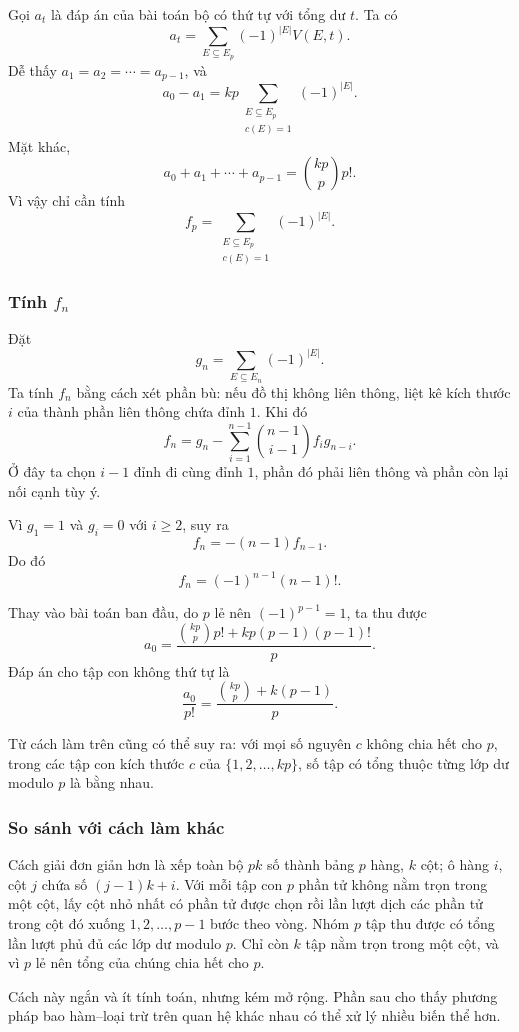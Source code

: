 \documentclass[11pt]{article}
\begin{document}
Gọi $a_t$ là đáp án của bài toán bộ có thứ tự với tổng dư $t$. Ta có
\[
  a_t=\sum_{E\subseteq E_p}(-1)^{|E|}V(E,t).
\]
Dễ thấy $a_1=a_2=\cdots=a_{p-1}$, và
\[
  a_0-a_1=kp\sum_{\substack{E\subseteq E_p\\ c(E)=1}}(-1)^{|E|}.
\]
Mặt khác,
\[
  a_0+a_1+\cdots+a_{p-1}=\binom{k p}{p}p!.
\]
Vì vậy chỉ cần tính
\[
  f_p=\sum_{\substack{E\subseteq E_p\\ c(E)=1}}(-1)^{|E|}.
\]

\subsubsection{\texorpdfstring{Tính \(f_n\)}{Tính fn}}

Đặt
\[
  g_n=\sum_{E\subseteq E_n}(-1)^{|E|}.
\]
Ta tính $f_n$ bằng cách xét phần bù: nếu đồ thị không liên thông, liệt kê kích
thước $i$ của thành phần liên thông chứa đỉnh $1$. Khi đó
\[
  f_n
  =g_n-\sum_{i=1}^{n-1}\binom{n-1}{i-1}f_i g_{n-i}.
\]
Ở đây ta chọn $i-1$ đỉnh đi cùng đỉnh $1$, phần đó phải liên thông và phần còn
lại nối cạnh tùy ý.

Vì $g_1=1$ và $g_i=0$ với $i\ge 2$, suy ra
\[
  f_n=-(n-1)f_{n-1}.
\]
Do đó
\[
  f_n=(-1)^{n-1}(n-1)!.
\]

Thay vào bài toán ban đầu, do $p$ lẻ nên $(-1)^{p-1}=1$, ta thu được
\[
  a_0=\frac{\binom{kp}{p}p!+kp(p-1)(p-1)!}{p}.
\]
Đáp án cho tập con không thứ tự là
\[
  \frac{a_0}{p!}=\frac{\binom{kp}{p}+k(p-1)}{p}.
\]

Từ cách làm trên cũng có thể suy ra: với mọi số nguyên $c$ không chia hết cho
$p$, trong các tập con kích thước $c$ của $\{1,2,\ldots,kp\}$, số tập có tổng
thuộc từng lớp dư modulo $p$ là bằng nhau.

\subsubsection{So sánh với cách làm khác}

Cách giải đơn giản hơn là xếp toàn bộ $pk$ số thành bảng $p$ hàng, $k$ cột; ô
hàng $i$, cột $j$ chứa số $(j-1)k+i$. Với mỗi tập con $p$ phần tử không nằm
trọn trong một cột, lấy cột nhỏ nhất có phần tử được chọn rồi lần lượt dịch các
phần tử trong cột đó xuống $1,2,\ldots,p-1$ bước theo vòng. Nhóm $p$ tập thu
được có tổng lần lượt phủ đủ các lớp dư modulo $p$. Chỉ còn $k$ tập nằm trọn
trong một cột, và vì $p$ lẻ nên tổng của chúng chia hết cho $p$.

Cách này ngắn và ít tính toán, nhưng kém mở rộng. Phần sau cho thấy phương pháp
bao hàm--loại trừ trên quan hệ khác nhau có thể xử lý nhiều biến thể hơn.
\end{document}
